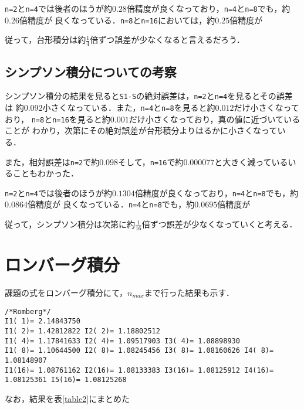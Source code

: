 \documentclass[a4j,11pt]{jarticle}
\begin{document}
\verb|n=2|と\verb|n=4|では後者のほうが約$0.28$倍精度が良くなっており，\verb|n=4|と\verb|n=8|でも，約$0.26$倍精度が
良くなっている．\verb|n=8|と\verb|n=16|においては，約$0.25$倍精度が

従って，台形積分は約$\frac{1}{4}$倍ずつ誤差が少なくなると言えるだろう．

\subsection{シンプソン積分についての考察}
シンプソン積分の結果を見ると\verb|S1-S|の絶対誤差は，\verb|n=2|と\verb|n=4|を見るとその誤差は
約$0.092$小さくなっている．また，\verb|n=4|と\verb|n=8|を見ると約$0.012$だけ小さくなっており，
\verb|n=8|と\verb|n=16|を見ると約$0.001$だけ小さくなっており，真の値に近づいていることが
わかり，次第にその絶対誤差が台形積分よりはるかに小さくなっている．

また，相対誤差は\verb|n=2|で約$0.098$そして，\verb|n=16|で約$0.000077$と大きく減っているいることもわかった．

\verb|n=2|と\verb|n=4|では後者のほうが約$0.1304$倍精度が良くなっており，\verb|n=4|と\verb|n=8|でも，約$0.0864$倍精度が
良くなっている．\verb|n=4|と\verb|n=8|でも，約$0.0695$倍精度が

従って，シンプソン積分は次第に約$\frac{1}{16}$倍ずつ誤差が少なくなっていくと考える．

\section{ロンバーグ積分}
課題の式をロンバーグ積分にて，$n_{max}$まで行った結果も示す．
\scriptsize
\begin{verbatim}
/*Romberg*/
I1( 1)= 2.14843750
I1( 2)= 1.42812822 I2( 2)= 1.18802512
I1( 4)= 1.17841633 I2( 4)= 1.09517903 I3( 4)= 1.08898930
I1( 8)= 1.10644500 I2( 8)= 1.08245456 I3( 8)= 1.08160626 I4( 8)= 1.08148907
I1(16)= 1.08761162 I2(16)= 1.08133383 I3(16)= 1.08125912 I4(16)= 1.08125361 I5(16)= 1.08125268
\end{verbatim}
\normalsize
なお，結果を表\ref{table2}にまとめた
\end{document}
